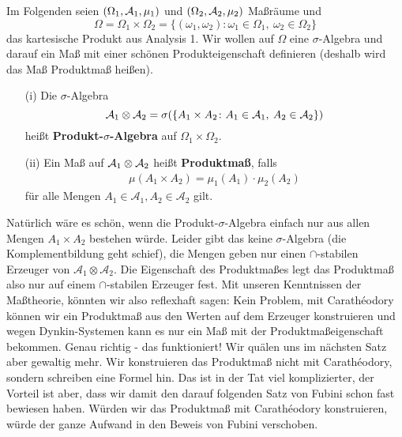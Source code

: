 Im Folgenden seien $(\Omega_1, \mathcal{A}_1, \mu_1)$ und $(\Omega_2, \mathcal{A}_2, \mu_2)$ Maßräume und $$\Omega = \Omega_1 \times \Omega_2 = \{ (\omega_1, \omega_2)\colon \omega_1 \in \Omega_1, \: \omega_2 \in \Omega_2 \}$$ das kartesische Produkt aus Analysis 1. Wir wollen auf $\Omega$ eine $\sigma$-Algebra und darauf ein Ma\ss{} mit einer sch\"onen Produkteigenschaft definieren (deshalb wird das Ma\ss{} Produktma\ss{} hei\ss en).
\begin{deff}
	\begin{enumerate}[label=(\alph*)]
		\item[(i)] Die $\sigma$-Algebra $$\mathcal{A}_1 \otimes \mathcal{A}_2 = \sigma(\{ A_1\times A_2 \colon A_1 \in \mathcal{A}_1, \: A_2 \in \mathcal{A}_2 \})$$ heißt \textbf{Produkt-$\sigma$-Algebra} auf $ \Omega_1 \times \Omega_2 $. 
		\item[(ii)] Ein Maß auf $ \mathcal{A}_1 \otimes \mathcal{A}_2 $ heißt \textbf{Produktmaß}, falls 
		\begin{align}\label{Produktformel}
		 \mu(A_1\times A_2) = \mu_1(A_1) \cdot \mu_2(A_2)
		 \end{align}
		f\"ur alle Mengen $A_1\in \mathcal A_1, A_2\in \mathcal A_2$ gilt.
	\end{enumerate}
\end{deff}
Nat\"urlich w\"are es sch\"on, wenn die Produkt-$\sigma$-Algebra einfach nur aus allen Mengen $A_1\times A_2$ bestehen w\"urde. Leider gibt das keine $\sigma$-Algebra (die Komplementbildung geht schief), die Mengen geben nur einen $\cap$-stabilen Erzeuger von $\mathcal A_1\otimes \mathcal A_2$. Die Eigenschaft des Produktma\ss es legt das Produktma\ss{} also nur auf einem $\cap$-stabilen Erzeuger fest. Mit unseren Kenntnissen der Ma\ss theorie, k\"onnten wir also reflexhaft sagen: Kein Problem, mit Carath\'eodory k\"onnen wir ein Produktma\ss{} aus den Werten auf dem Erzeuger konstruieren und wegen Dynkin-Systemen kann es nur ein Ma\ss{} mit der Produktma\ss eigenschaft bekommen. Genau richtig - das funktioniert! Wir qu\"alen uns im n\"achsten Satz aber gewaltig mehr. Wir konstruieren das Produktma\ss{} nicht mit Carath\'eodory, sondern schreiben eine Formel hin. Das ist in der Tat viel komplizierter, der Vorteil ist aber, dass wir damit den darauf folgenden Satz von Fubini schon fast bewiesen haben. W\"urden wir das Produktma\ss{} mit Carath\'eodory konstruieren, w\"urde der ganze Aufwand in den Beweis von Fubini verschoben.




